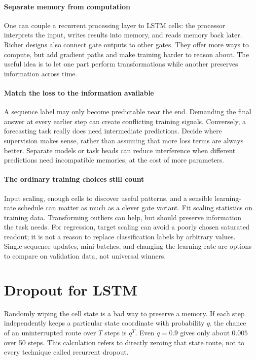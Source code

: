 \documentclass[11pt, oneside]{book}
\let\originalsection\section
\renewcommand{\section}{\Needspace{7\baselineskip}\originalsection}
\begin{document}
\paragraph{Separate memory from computation} One can couple a recurrent processing layer to LSTM cells: the processor interprets the input, writes results into memory, and reads memory back later. Richer designs also connect gate outputs to other gates. They offer more ways to compute, but add gradient paths and make training harder to reason about. The useful idea is to let one part perform transformations while another preserves information across time.

\paragraph{Match the loss to the information available} A sequence label may only become predictable near the end. Demanding the final answer at every earlier step can create conflicting training signals. Conversely, a forecasting task really does need intermediate predictions. Decide where supervision makes sense, rather than assuming that more loss terms are always better. Separate models or task heads can reduce interference when different predictions need incompatible memories, at the cost of more parameters.

\paragraph{The ordinary training choices still count} Input scaling, enough cells to discover useful patterns, and a sensible learning-rate schedule can matter as much as a clever gate variant. Fit scaling statistics on training data. Transforming outliers can help, but should preserve information the task needs. For regression, target scaling can avoid a poorly chosen saturated readout; it is not a reason to replace classification labels by arbitrary values. Single-sequence updates, mini-batches, and changing the learning rate are options to compare on validation data, not universal winners.

\section{Dropout for LSTM}\label{sec:source-3-4}
Randomly wiping the cell state is a bad way to preserve a memory. If each step independently keeps a particular state coordinate with probability $q$, the chance of an uninterrupted route over $T$ steps is $q^T$. Even $q=0.9$ gives only about $0.005$ over 50 steps. This calculation refers to directly zeroing that state route, not to every technique called recurrent dropout.
\end{document}
